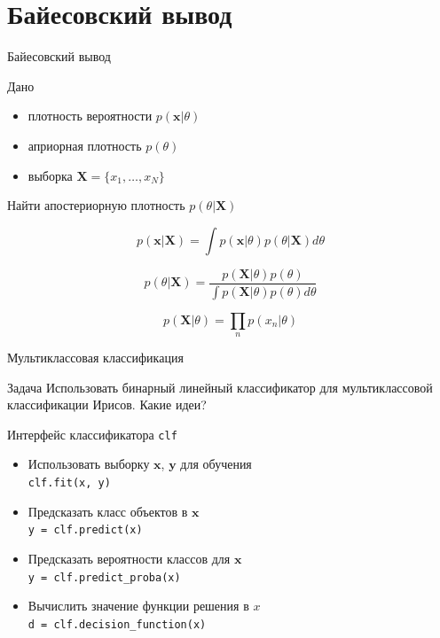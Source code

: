 \documentclass[10pt,a4paper]{beamer}
\begin{document}

\section{Байесовский вывод}


\begin{frame}{Байесовский вывод}

\begin{block}{Дано}
\begin{itemize}
\item плотность вероятности $p(\mathbf{x} | \theta)$
\item априорная плотность $p(\theta)$
\item выборка $\mathbf{X} = \{x_1, \ldots, x_N\}$
\end{itemize}
\end{block}

\begin{exampleblock}{Найти}
апостериорную плотность $p(\theta | \mathbf{X})$
\end{exampleblock}

\[
p(\mathbf{x} | \mathbf{X}) = \int p(\mathbf{x} | \theta) p(\theta|\mathbf{X}) d\theta
\]

\[
p(\theta | \mathbf{X}) = \frac{p(\mathbf{X} | \theta) p(\theta)}{\int p(\mathbf{X} | \theta) p(\theta) d\theta}
\]

\[
p(\mathbf{X} | \theta) = \prod_n p(x_n | \theta)
\]

\end{frame}


\begin{frame}{Мультиклассовая классификация}

\begin{block}{Задача}
Использовать бинарный линейный классификатор для мультиклассовой классификации Ирисов. Какие идеи?
\end{block}

\vspace{1em}
Интерфейс классификатора  \texttt{clf}
\begin{itemize}
\item Использовать выборку $\mathbf{x}$, $\mathbf{y}$ для обучения \\ \texttt{\quad clf.fit(x, y)}
\item Предсказать класс объектов в $\mathbf{x}$ \\ \texttt{\quad y = clf.predict(x)}
\item Предсказать вероятности классов для $\mathbf{x}$ \\ \texttt{\quad y = clf.predict\_proba(x)}
\item Вычислить значение функции решения в $x$ \\ \texttt{\quad d = clf.decision\_function(x)}
\end{itemize}

\end{frame}
\end{document}
